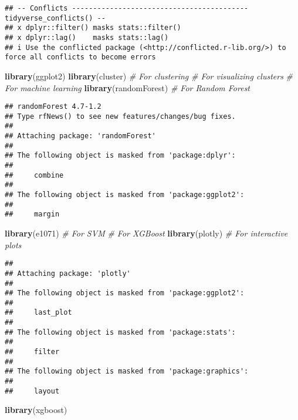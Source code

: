 \documentclass[
]{article}
\newenvironment{Shaded}{\begin{snugshade}}{\end{snugshade}}
\newcommand{\CommentTok}[1]{\textcolor[rgb]{0.56,0.35,0.01}{\textit{#1}}}
\newcommand{\FunctionTok}[1]{\textcolor[rgb]{0.13,0.29,0.53}{\textbf{#1}}}
\newcommand{\NormalTok}[1]{#1}
\begin{document}
\begin{verbatim}
## -- Conflicts ------------------------------------------ tidyverse_conflicts() --
## x dplyr::filter() masks stats::filter()
## x dplyr::lag()    masks stats::lag()
## i Use the conflicted package (<http://conflicted.r-lib.org/>) to force all conflicts to become errors
\end{verbatim}

\begin{Shaded}
\begin{Highlighting}[]
\FunctionTok{library}\NormalTok{(ggplot2)}
\FunctionTok{library}\NormalTok{(cluster)       }\CommentTok{\# For clustering}
    \CommentTok{\# For visualizing clusters}
       \CommentTok{\# For machine learning}
\FunctionTok{library}\NormalTok{(randomForest)   }\CommentTok{\# For Random Forest}
\end{Highlighting}
\end{Shaded}

\begin{verbatim}
## randomForest 4.7-1.2
## Type rfNews() to see new features/changes/bug fixes.
## 
## Attaching package: 'randomForest'
## 
## The following object is masked from 'package:dplyr':
## 
##     combine
## 
## The following object is masked from 'package:ggplot2':
## 
##     margin
\end{verbatim}

\begin{Shaded}
\begin{Highlighting}[]
\FunctionTok{library}\NormalTok{(e1071)          }\CommentTok{\# For SVM}
      \CommentTok{\# For XGBoost}
\FunctionTok{library}\NormalTok{(plotly)         }\CommentTok{\# For interactive plots}
\end{Highlighting}
\end{Shaded}

\begin{verbatim}
## 
## Attaching package: 'plotly'
## 
## The following object is masked from 'package:ggplot2':
## 
##     last_plot
## 
## The following object is masked from 'package:stats':
## 
##     filter
## 
## The following object is masked from 'package:graphics':
## 
##     layout
\end{verbatim}

\begin{Shaded}
\begin{Highlighting}[]
\FunctionTok{library}\NormalTok{(xgboost)  }
\end{Highlighting}
\end{Shaded}
\end{document}
